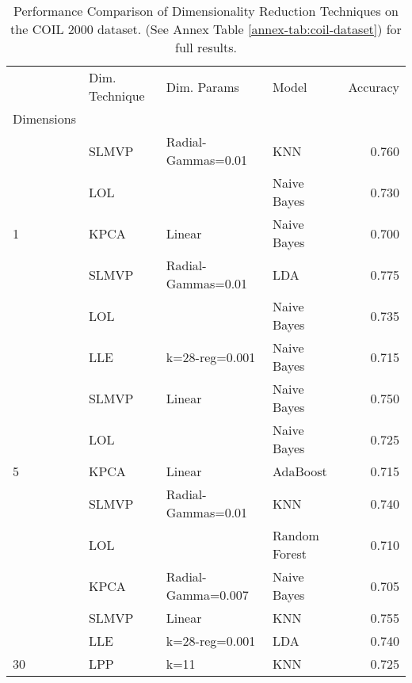 \begin{table}[!h]
    \begin{tabular}{llllr}
        \toprule
        {}                                       & Dim. Technique & Dim. Params        & Model         & Accuracy \\
        Dimensions                               &                &                    &               &          \\
        \midrule
                                                 & SLMVP          & Radial-Gammas=0.01 & KNN           & 0.760    \\
                                                 & LOL            &                    & Naive Bayes   & 0.730    \\
        \multirow{-3}{*}{1}                      & KPCA           & Linear             & Naive Bayes   & 0.700    \\
        \rowcolor{lightgray}                     & SLMVP          & Radial-Gammas=0.01 & LDA           & 0.775    \\
        \rowcolor{lightgray}                     & LOL            &                    & Naive Bayes   & 0.735    \\
        \rowcolor{lightgray}\multirow{-3}{*}{3}  & LLE            & k=28-reg=0.001     & Naive Bayes   & 0.715    \\
                                                 & SLMVP          & Linear             & Naive Bayes   & 0.750    \\
                                                 & LOL            &                    & Naive Bayes   & 0.725    \\
        \multirow{-3}{*}{5}                      & KPCA           & Linear             & AdaBoost      & 0.715    \\
        \rowcolor{lightgray}                     & SLMVP          & Radial-Gammas=0.01 & KNN           & 0.740    \\
        \rowcolor{lightgray}                     & LOL            &                    & Random Forest & 0.710    \\
        \rowcolor{lightgray}\multirow{-3}{*}{15} & KPCA           & Radial-Gamma=0.007 & Naive Bayes   & 0.705    \\
                                                 & SLMVP          & Linear             & KNN           & 0.755    \\
                                                 & LLE            & k=28-reg=0.001     & LDA           & 0.740    \\
        \multirow{-3}{*}{30}                     & LPP            & k=11               & KNN           & 0.725    \\
        \bottomrule
    \end{tabular}
    \caption{Performance Comparison of Dimensionality Reduction Techniques on the COIL 2000 dataset. (See Annex Table \ref{annex-tab:coil-dataset}) for full results.}
    \label{tab:coil-dataset}
\end{table}

